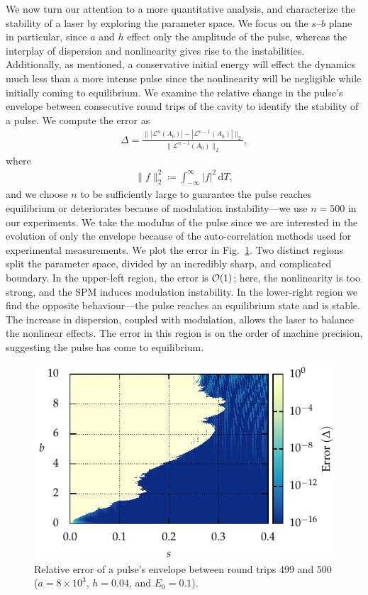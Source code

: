 \documentclass[9pt,twocolumn,twoside]{osajnl}
\let\originalleft\left
\let\originalright\right
\renewcommand{\left}{\mathopen{}\mathclose\bgroup\originalleft}
\renewcommand{\right}{\aftergroup\egroup\originalright}
\providecommand{\df}{\textrm{d}} %
\providecommand{\bigO}[1]{\ensuremath{\mathop{}\mathopen{}\mathcal{O}\mathopen{}\left(#1\right)}} %
\begin{document}
We now turn our attention to a more quantitative analysis, and characterize the stability of a laser by exploring the parameter space. We focus on the $s$--$b$ plane in particular, since $a$ and $h$ effect only the amplitude of the pulse, whereas the interplay of dispersion and nonlinearity gives rise to the instabilities. Additionally, as mentioned, a conservative initial energy will effect the dynamics much less than a more intense pulse since the nonlinearity will be negligible while initially coming to equilibrium. We examine the relative change in the pulse's envelope between consecutive round trips of the cavity to identify the stability of a pulse. We compute the error as
\begin{align}
	\Delta = \frac{\| |\mathcal{L}^n(A_0)| - |\mathcal{L}^{n-1}(A_0)| \|_2}{\| \mathcal{L}^{n-1}(A_0) \|_2},
	\label{eq:error}
\end{align}
where
\begin{align}
	\| f \|_2^2 \coloneqq \int_{-\infty}^\infty |f|^2 \, \df T,
\end{align}
and we choose $n$ to be sufficiently large to guarantee the pulse reaches equilibrium or deteriorates because of modulation instability---we use $n = 500$ in our experiments. We take the modulus of the pulse since we are interested in the evolution of only the envelope because of the auto-correlation methods used for experimental measurements. We plot the error in Fig.~\ref{fig:error}. Two distinct regions split the parameter space, divided by an incredibly sharp, and complicated boundary. In the upper-left region, the error is $\bigO{1}$; here, the nonlinearity is too strong, and the SPM induces modulation instability. In the lower-right region we find the opposite behaviour---the pulse reaches an equilibrium state and is stable. The increase in dispersion, coupled with modulation, allows the laser to balance the nonlinear effects. The error in this region is on the order of machine precision, suggesting the pulse has come to equilibrium.

\begin{figure}[tbp]
	\centering
	\includegraphics{Figures/ParamSpaceErr}
	\caption{Relative error of a pulse's envelope between round trips 499 and 500 ($a = 8 \times 10^3$, $h = 0.04$, and $E_0 = 0.1$).}
	\label{fig:error}
\end{figure}
\end{document}
